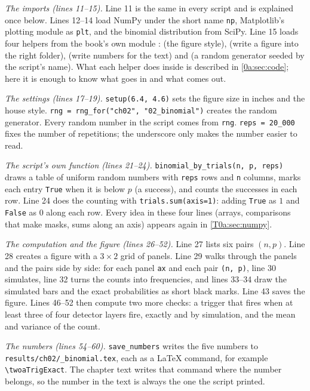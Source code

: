 \emph{The imports (lines 11--15).} Line 11 is the same in every script and is explained once below. Lines 12--14 load NumPy under the short name \texttt{np}, Matplotlib's plotting module as \texttt{plt}, and the binomial distribution from SciPy. Line 15 loads four helpers from the book's own module :  (the figure style),  (write a figure into the right folder),  (write numbers for the text) and  (a random generator seeded by the script's name). What each helper does inside is described in \cref{0a:sec:code}; here it is enough to know what goes in and what comes out.

\emph{The settings (lines 17--19).} \texttt{setup(6.4, 4.6)} sets the figure size in inches and the house style. \texttt{rng = rng\_for("ch02", "02\_binomial")} creates the random generator. Every random number in the script comes from \texttt{rng}. \texttt{reps = 20\_000} fixes the number of repetitions; the underscore only makes the number easier to read.

\emph{The script's own function (lines 21--24).} \texttt{binomial\_by\_trials(n, p, reps)} draws a table of uniform random numbers with \texttt{reps} rows and \texttt{n} columns, marks each entry \texttt{True} when it is below $p$ (a success), and counts the successes in each row. Line 24 does the counting with \texttt{trials.sum(axis=1)}: adding \texttt{True} as $1$ and \texttt{False} as $0$ along each row. Every idea in these four lines (arrays, comparisons that make masks, sums along an axis) appears again in \cref{T0a:sec:numpy}.

\emph{The computation and the figure (lines 26--52).} Line 27 lists six pairs $(n,p)$. Line 28 creates a figure with a $3\times2$ grid of panels. Line 29 walks through the panels and the pairs side by side: for each panel \texttt{ax} and each pair \texttt{(n, p)}, line 30 simulates, line 32 turns the counts into frequencies, and lines 33--34 draw the simulated bars and the exact probabilities as short black marks. Line 43 saves the figure. Lines 46--52 then compute two more checks: a trigger that fires when at least three of four detector layers fire, exactly and by simulation, and the mean and variance of the count.

\emph{The numbers (lines 54--60).} \texttt{save\_numbers} writes the five numbers to \texttt{results/\allowbreak ch02/\_binomial.tex}, each as a \LaTeX{} command, for example \verb|\twoaTrigExact|. The chapter text writes that command where the number belongs, so the number in the text is always the one the script printed.


